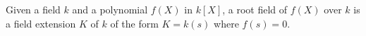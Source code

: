 Given a field $k$ and a polynomial $f(X)$ in $k[X]$, a root field of $f(X)$ over $k$ is a field extension $K$ of $k$ of the form $K = k(s)$ where $f(s) = 0$.
